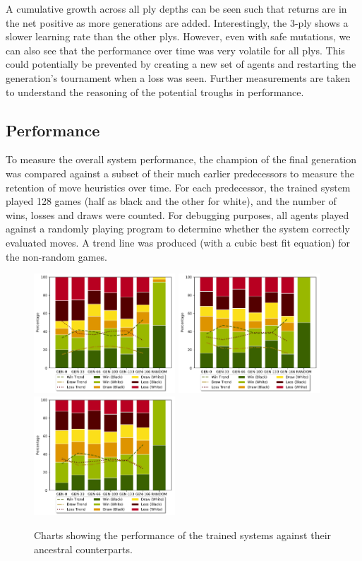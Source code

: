 \documentclass[12pt,a4paper]{article}
\begin{document}
    A cumulative growth across all ply depths can be seen such that returns are in the net positive as more generations are added. Interestingly, the 3-ply shows a slower learning rate than the other plys. However, even with safe mutations, we can also see that the performance over time was very volatile for all plys. This could potentially be prevented by creating a new set of agents and restarting the generation's tournament when a loss was seen. Further measurements are taken to understand the reasoning of the potential troughs in performance. 
    
    \subsection{Performance}
    To measure the overall system performance, the champion of the final generation was compared against a subset of their much earlier predecessors to measure the retention of move heuristics over time. For each predecessor, the trained system played 128 games (half as black and the other for white), and the number of wins, losses and draws were counted. For debugging purposes, all agents played against a randomly playing program to determine whether the system correctly evaluated moves. A trend line was produced (with a cubic best fit equation) for the non-random games.
    \begin{figure}[!ht]
        \centering
        \includegraphics[width=53mm]{images/results/1ply/gm_net_stats.pdf}
        \includegraphics[width=53mm]{images/results/3ply/gm_net_stats.pdf}
        \includegraphics[width=53mm]{images/results/6ply/gm_net_stats.pdf}
        \caption{Charts showing the performance of the trained systems against their ancestral counterparts.\label{net_stats}}
    \end{figure}
    
\end{document}
